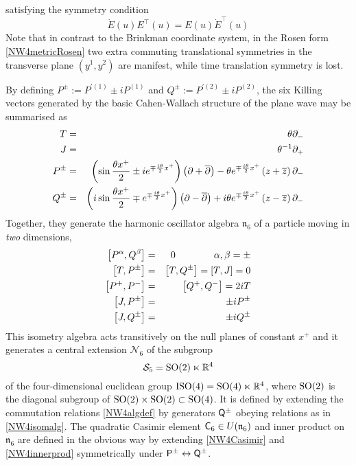 satisfying the symmetry condition
\begin{equation}
  \label{Esymcond}
  \dot E(u) E^\top(u)=E(u) \dot E^\top(u)
\end{equation}
Note that in contrast to the Brinkman coordinate system, in the Rosen form
\eqref{NW4metricRosen} two extra commuting translational symmetries in the
transverse plane $(y^1,y^2)$ are manifest, while time translation symmetry is
lost.

By defining $P^\pm:=P^{\prime (1)}\pm i P^{(1)}$ and $ Q^{\pm}:=P^{\prime
  (2)}\pm i P^{(2)}$, the six Killing vectors generated by the basic
Cahen-Wallach structure of the plane wave may be summarised as
\begin{eqnarray}
  \label{6CWKilling}
  T&=&\theta \partial_-   \\
  J&=&\theta^{-1} \partial_+   \nonumber\\
  P^\pm&=&\left(\sin\frac{\theta x^+}2 \pm i e^{\mp 
      \frac{ i \theta}2 x^+}\right)
  \left(\partial+\overline{\partial} \right)-\theta e^{\mp 
    \frac{ i \theta}2 x^+} \left(
    z+\overline{z} \right) \partial_-   \nonumber\\
  Q^{\pm}&=&\left( i \sin\frac{\theta x^+}2 \mp
    e^{\mp \frac{ i \theta}2 x^+}\right)
  \left(\partial-\overline{\partial} \right)+ i \theta e^{\mp 
    \frac{ i \theta}2 x^+} \left(
    z-\overline{z} \right) \partial_-  \nonumber
\end{eqnarray}
Together, they generate the harmonic oscillator algebra
$\mathfrak{n}_6$ of a particle moving in {\it two} dimensions,
\begin{eqnarray}
  \label{NW4isomalg}
  \left[P^\alpha ,  Q^{\beta}\right]&=&0 \qquad\qquad\alpha,\beta=\pm   \\
  \left[T ,P^\pm\right]&=&\left[T, Q^{\pm}\right] = \left[T , J\right] = 0\nonumber\\
  \left[P^+ , P^-\right]&=&\left[Q^{+}, Q^{-}\right] = 2iT\nonumber\\
  \left[J , P^\pm\right]&=&\pm iP^\pm\nonumber\\
  \left[J ,  Q^{\pm}\right]&=&\pm i  Q^{\pm} \nonumber
\end{eqnarray}
This isometry algebra acts transitively on the null planes of constant
  $x^+$ and it generates a central extension ${\mathcal
  N}_6$ of the subgroup
\begin{equation}
  \label{S5subgp}
  \mathcal{S}_5={\rm SO}(2)\ltimes{\mathbb R}^4
\end{equation}
of the four-dimensional euclidean group ${\rm ISO}(4)={\rm SO}(4)\ltimes{\mathbb R}^4$,
where ${\rm SO}(2)$ is the diagonal subgroup of ${\rm SO}(2)\times{\rm
  SO}(2)\subset{\rm SO}(4)$. It is defined by extending the commutation
relations \eqref{NW4algdef} by generators ${\sf Q}^{\pm}$ obeying relations as in
\eqref{NW4isomalg}. The quadratic Casimir element ${\sf C}_6\in
U(\mathfrak{n}_6)$ and inner product on $\mathfrak{n}_6$ are defined in the
obvious way by extending \eqref{NW4Casimir} and \eqref{NW4innerprod}
symmetrically under ${\sf P}^\pm\leftrightarrow{\sf Q}^\pm$.

